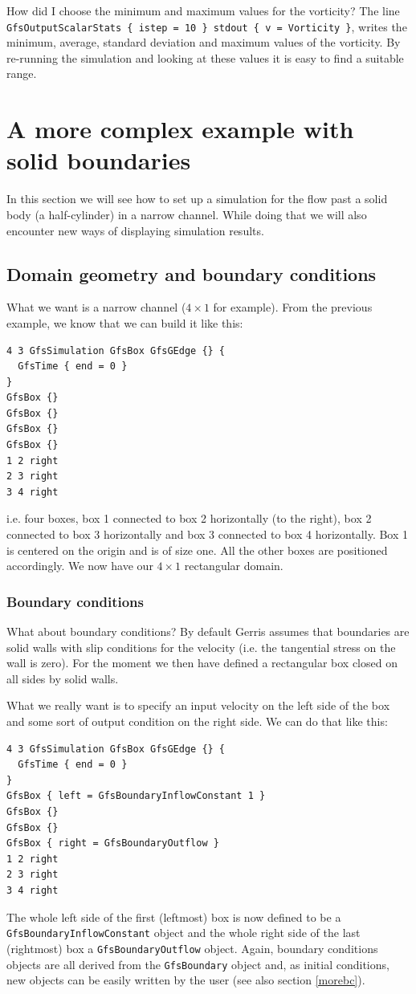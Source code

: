 \documentclass[a4paper]{article}
\begin{document}
How did I choose the minimum and maximum values for the vorticity? The 
line {\tt GfsOutputScalarStats \{ istep = 10 \} stdout \{ v = Vorticity
\}}, writes the minimum, average, standard deviation and maximum
values of the vorticity. By re-running the simulation and looking at
these values it is easy to find a suitable range.

\section{A more complex example with solid boundaries}

In this section we will see how to set up a simulation for the flow past 
a solid body (a half-cylinder) in a narrow channel. While doing that
we will also encounter new ways of displaying simulation results.

\subsection{Domain geometry and boundary conditions}

What we want is a narrow channel ($4\times 1$ for example). From the
previous example, we know that we can build it like this:
\begin{verbatim}
4 3 GfsSimulation GfsBox GfsGEdge {} {
  GfsTime { end = 0 }
}
GfsBox {}
GfsBox {}
GfsBox {}
GfsBox {}
1 2 right
2 3 right
3 4 right
\end{verbatim}
i.e. four boxes, box 1 connected to box 2 horizontally (to the right),
box 2 connected to box 3 horizontally and box 3 connected to box 4
horizontally. Box 1 is centered on the origin and is of size one. All
the other boxes are positioned accordingly. We now have our $4\times
1$ rectangular domain.

\subsubsection{Boundary conditions}

What about boundary conditions? By default Gerris assumes that
boundaries are solid walls with slip conditions for the velocity
(i.e. the tangential stress on the wall is zero). For the moment we
then have defined a rectangular box closed on all sides by solid
walls.

What we really want is to specify an input velocity on the left side
of the box and some sort of output condition on the right side. We can
do that like this:
\begin{verbatim}
4 3 GfsSimulation GfsBox GfsGEdge {} {
  GfsTime { end = 0 }
}
GfsBox { left = GfsBoundaryInflowConstant 1 }
GfsBox {}
GfsBox {}
GfsBox { right = GfsBoundaryOutflow }
1 2 right
2 3 right
3 4 right
\end{verbatim}
The whole left side of the first (leftmost) box is now defined to be a {\tt
GfsBoundaryInflowConstant} object and the whole right side of the last
(rightmost) box a {\tt GfsBoundaryOutflow} object. Again, boundary
conditions objects are all derived from the {\tt GfsBoundary} object
and, as initial conditions, new objects can be easily written by the
user (see also section \ref{morebc}).
\end{document}
